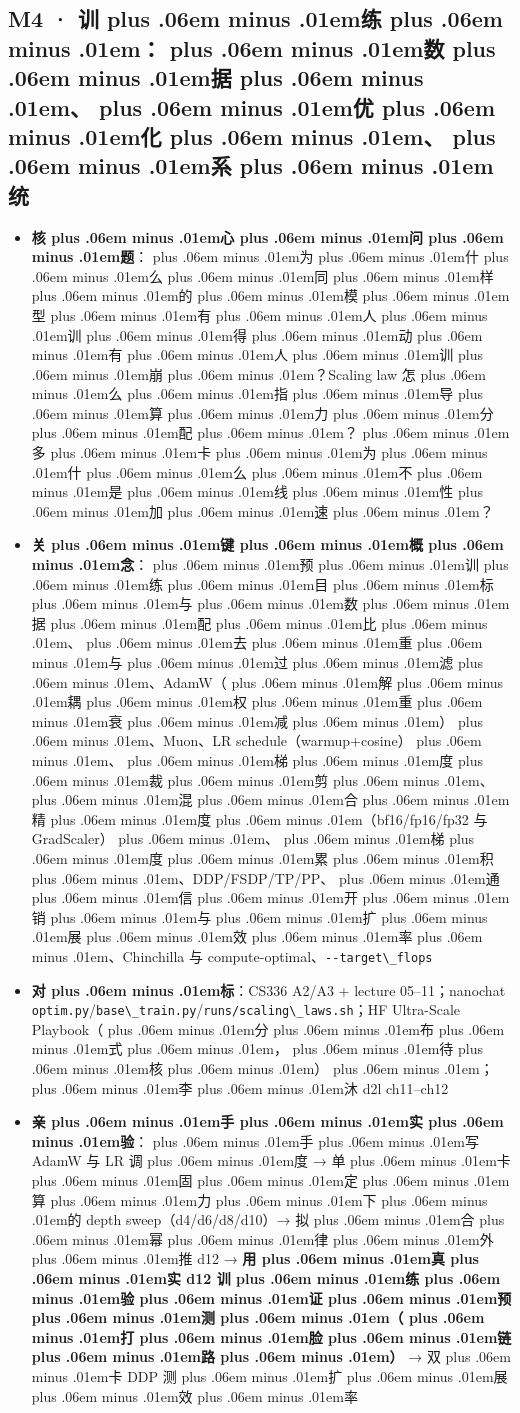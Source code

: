 \documentclass[
]{article}
\newcommand{\passthrough}[1]{#1}
\providecommand{\tightlist}{%
  \setlength{\itemsep}{0pt}\setlength{\parskip}{0pt}}
\def\zh#1{{\zhfont #1}}
\def\sym#1{{\symfont #1}}
\def\zhglue{\hskip0pt plus .06em minus .01em}
\begin{document}
\subsection{M4 \sym{·} \zh{训\zhglue 练\zhglue ：\zhglue 数\zhglue 据\zhglue 、\zhglue 优\zhglue 化\zhglue 、\zhglue 系\zhglue 统}}\label{m4-ux8badux7ec3ux6570ux636eux4f18ux5316ux7cfbux7edf}

\begin{itemize}
\tightlist
\item
  \textbf{\zh{核\zhglue 心\zhglue 问\zhglue 题}}\zh{：\zhglue 为\zhglue 什\zhglue 么\zhglue 同\zhglue 样\zhglue 的\zhglue 模\zhglue 型\zhglue 有\zhglue 人\zhglue 训\zhglue 得\zhglue 动\zhglue 有\zhglue 人\zhglue 训\zhglue 崩\zhglue ？}Scaling law \zh{怎\zhglue 么\zhglue 指\zhglue 导\zhglue 算\zhglue 力\zhglue 分\zhglue 配\zhglue ？\zhglue 多\zhglue 卡\zhglue 为\zhglue 什\zhglue 么\zhglue 不\zhglue 是\zhglue 线\zhglue 性\zhglue 加\zhglue 速\zhglue ？}
\item
  \textbf{\zh{关\zhglue 键\zhglue 概\zhglue 念}}\zh{：\zhglue 预\zhglue 训\zhglue 练\zhglue 目\zhglue 标\zhglue 与\zhglue 数\zhglue 据\zhglue 配\zhglue 比\zhglue 、\zhglue 去\zhglue 重\zhglue 与\zhglue 过\zhglue 滤\zhglue 、}AdamW\zh{（\zhglue 解\zhglue 耦\zhglue 权\zhglue 重\zhglue 衰\zhglue 减\zhglue ）\zhglue 、}Muon\zh{、}LR schedule\zh{（}warmup+cosine\zh{）\zhglue 、\zhglue 梯\zhglue 度\zhglue 裁\zhglue 剪\zhglue 、\zhglue 混\zhglue 合\zhglue 精\zhglue 度\zhglue （}bf16/fp16/fp32 \zh{与} GradScaler\zh{）\zhglue 、\zhglue 梯\zhglue 度\zhglue 累\zhglue 积\zhglue 、}DDP/FSDP/TP/PP\zh{、\zhglue 通\zhglue 信\zhglue 开\zhglue 销\zhglue 与\zhglue 扩\zhglue 展\zhglue 效\zhglue 率\zhglue 、}Chinchilla \zh{与} compute-optimal\zh{、}\passthrough{\lstinline!--target\_flops!}
\item
  \textbf{\zh{对\zhglue 标}}\zh{：}CS336 A2/A3 + lecture 05--11\zh{；}nanochat \passthrough{\lstinline!optim.py!}/\passthrough{\lstinline!base\_train.py!}/\passthrough{\lstinline!runs/scaling\_laws.sh!}\zh{；}HF Ultra-Scale Playbook\zh{（\zhglue 分\zhglue 布\zhglue 式\zhglue ，\zhglue 待\zhglue 核\zhglue ）\zhglue ；\zhglue 李\zhglue 沐} d2l ch11--ch12
\item
  \textbf{\zh{亲\zhglue 手\zhglue 实\zhglue 验}}\zh{：\zhglue 手\zhglue 写} AdamW \zh{与} LR \zh{调\zhglue 度} \sym{→} \zh{单\zhglue 卡\zhglue 固\zhglue 定\zhglue 算\zhglue 力\zhglue 下\zhglue 的} depth sweep\zh{（}d4/d6/d8/d10\zh{）}\sym{→} \zh{拟\zhglue 合\zhglue 幂\zhglue 律\zhglue 外\zhglue 推} d12 \sym{→} \textbf{\zh{用\zhglue 真\zhglue 实} d12 \zh{训\zhglue 练\zhglue 验\zhglue 证\zhglue 预\zhglue 测\zhglue （\zhglue 打\zhglue 脸\zhglue 链\zhglue 路\zhglue ）}} \sym{→} \zh{双\zhglue 卡} DDP \zh{测\zhglue 扩\zhglue 展\zhglue 效\zhglue 率}

\end{itemize}
\end{document}
